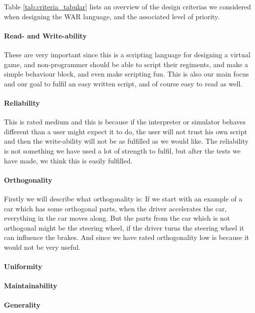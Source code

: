 Table \ref{tab:criteria_tabular} lists an overview of the design criterias we considered when designing the WAR language, and the associated level of priority.

\paragraph{Read- and Write-ability} These are very important since this is a scripting language for designing a virtual game, and non-programmer should be able to script their regiments, and make a simple behaviour block, and even make scripting fun. This is also our main focus and our goal to fulfil an easy written script, and of course easy to read as well.

\paragraph{Reliability} This is rated medium and this is because if the interpreter or simulator behaves different than a user might expect it to do, the user will not trust his own script and then the write-ability will not be as fulfilled as we would like. The reliability is not something we have used a lot of strength to fulfil, but after the tests we have made, we think this is easily fulfilled.

\paragraph{Orthogonality} Firstly we will describe what orthogonality is: If we start with an example of a car which has some orthogonal parts, when the driver accelerates the car, everything in the car moves along. But the parts from the car which is not orthogonal might be the steering wheel, if the driver turns the steering wheel it can influence the brakes. And since we have rated orthogonality low is because it would not be very useful.
 
\paragraph{Uniformity} 


\paragraph{Maintainability} 
\paragraph{Generality} 
